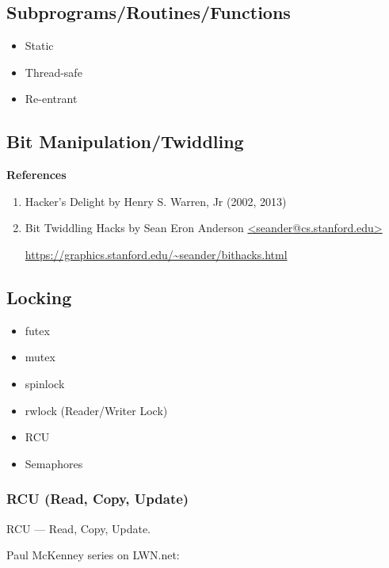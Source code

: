 \documentclass[12pt,a4paper]{article}
\begin{document}
\subsection{Subprograms/Routines/Functions}

\begin{itemize}
\item Static
\item Thread-safe
\item Re-entrant
\end{itemize}

\subsection{Bit Manipulation/Twiddling}

\textbf{References}

\begin{enumerate}
\item Hacker's Delight by Henry S. Warren, Jr (2002, 2013)

\item Bit Twiddling Hacks by Sean Eron Anderson \url{<seander@cs.stanford.edu>}

    \small
    \url{https://graphics.stanford.edu/~seander/bithacks.html}

\end{enumerate}

\subsection{Locking}

\begin{itemize}
\item futex
\item mutex
\item spinlock
\item rwlock (Reader/Writer Lock)
\item RCU
\item Semaphores
\end{itemize}

\subsubsection{RCU (Read, Copy, Update)}

RCU --- Read, Copy, Update.

Paul McKenney series on LWN.net:
\end{document}
